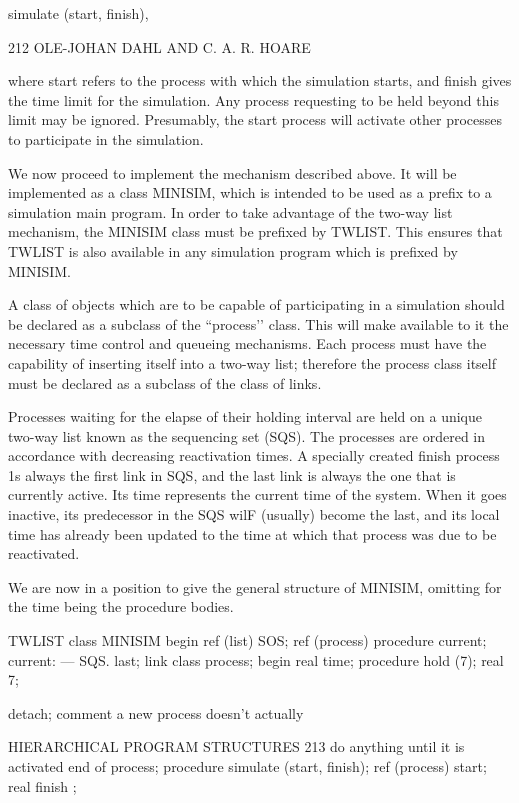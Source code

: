 {{{{{		simulate (start, finish),
		
		212 OLE-JOHAN DAHL AND C. A. R. HOARE
		
		where start refers to the process with which the simulation starts, and finish gives the time limit for the simulation. Any process requesting to be held beyond this limit may be ignored. Presumably, the start process will activate other processes to participate in the simulation.
		
		We now proceed to implement the mechanism described above. It will be implemented as a class MINISIM, which is intended to be used as a prefix to a simulation main program. In order to take advantage of the two-way list mechanism, the MINISIM class must be prefixed by TWLIST. This ensures that TWLIST is also available in any simulation program which is prefixed by MINISIM.
		
		A class of objects which are to be capable of participating in a simulation should be declared as a subclass of the “process’’ class. This will make available to it the necessary time control and queueing mechanisms. Each process must have the capability of inserting itself into a two-way list; therefore the process class itself must be declared as a subclass of the class of links.
		
		Processes waiting for the elapse of their holding interval are held on a unique two-way list known as the sequencing set (SQS). The processes are ordered in accordance with decreasing reactivation times. A specially created finish process 1s always the first link in SQS, and the last link is always the one that is currently active. Its time represents the current time of the system. When it goes inactive, its predecessor in the SQS wilF (usually) become the last, and its local time has already been updated to the time at which that process was due to be reactivated.
		
		We are now in a position to give the general structure of MINISIM, omitting for the time being the procedure bodies.
		
		TWLIST class MINISIM begin ref (list) SOS; ref (process) procedure current; current: — SQS. last; link class process; begin real time; procedure hold (7); real 7;
		
		detach; comment a new process doesn’t actually
		
		HIERARCHICAL PROGRAM STRUCTURES 213 do anything until it is activated end of process; procedure simulate (start, finish); ref (process) start; real finish ;
		
}}}}}
